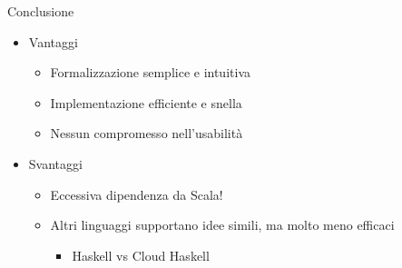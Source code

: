 \begin{frame}{Conclusione}
	\begin{itemize}
		\item Vantaggi
		\begin{itemize}
			\item Formalizzazione semplice e intuitiva
			\item Implementazione efficiente e snella
			\item Nessun compromesso nell'usabilità
		\end{itemize}
		\item Svantaggi
		\begin{itemize}
			\item Eccessiva dipendenza da Scala!
			\item Altri linguaggi supportano idee simili, ma molto meno efficaci
			\begin{itemize}
				\item Haskell vs Cloud Haskell
			\end{itemize}
		\end{itemize}
	\end{itemize}
\end{frame}